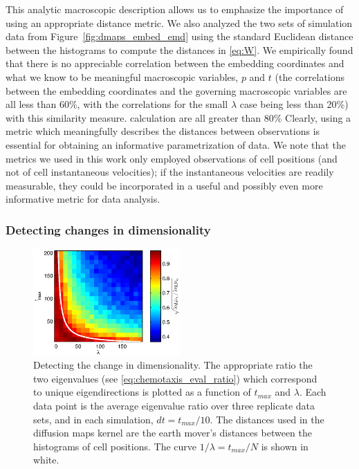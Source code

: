\documentclass[3p]{elsarticle}
\begin{document}

This analytic macroscopic description allows us to emphasize the importance of using an appropriate distance metric.
%
We also analyzed the two sets of simulation data from Figure~\ref{fig:dmaps_embed_emd} using the standard 
Euclidean distance between the histograms to compute the distances in \eqref{eq:W}.
%
We empirically found that there is no appreciable correlation between the embedding 
coordinates and what we know to be meaningful macroscopic variables, $p$ and $t$ (the correlations between the embedding 
coordinates and the governing macroscopic variables are all less than 60\%, with the correlations for 
the small $\lambda$ case being less than 20\%) with this similarity measure.
%
calculation are all greater than 80\%
%
Clearly, using a metric which meaningfully describes the distances between observations 
is essential for obtaining an informative parametrization of data.
%
We note that the metrics we used in this work only employed observations of cell positions (and not of cell instantaneous
velocities); if the instantaneous velocities are readily measurable, they could be incorporated in a useful
and possibly even more informative metric for data analysis.

\subsubsection{Detecting changes in dimensionality}

\begin{figure}[t]
%
\centering
\includegraphics[width=0.5\textwidth]{tmax_lambda_transition}
%
\caption{Detecting the change in dimensionality. The appropriate ratio the two eigenvalues (see \eqref{eq:chemotaxis_eval_ratio}) which correspond to unique eigendirections is plotted as a function of $t_{max}$ and $\lambda$. Each data point is the average eigenvalue ratio over three replicate data sets, and in each simulation, $dt=t_{max}/10$. The distances used in the diffusion maps kernel are the earth mover's distances between the histograms of cell positions. The curve $1/\lambda = t_{max}/N$ is shown in white. }
%
\label{fig:chemotaxis_compare_timescales_evals}
%
\end{figure}
\end{document}
